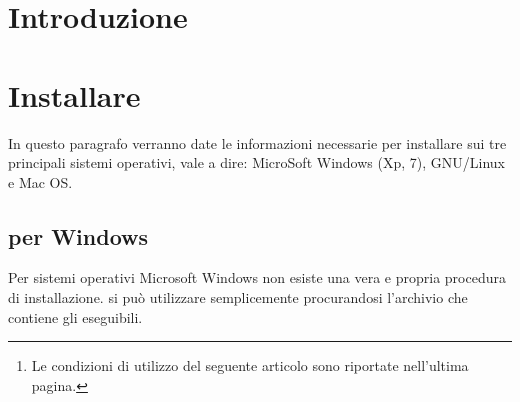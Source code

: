 \documentclass[10pt,a4paper]{article}
\title{\titolo}
\author{%
\autorea \and 
\autoreb \and 
\autorec
}
\date{\today\thanks{Le condizioni di utilizzo del seguente articolo
    sono riportate nell'ultima pagina.}}
\begin{document}
 
\maketitle
\begin{abstract}
\noindent In questo articolo vengono brevemente presentati il
programma \emacs{} ed il pacchetto \auctex, per le principali
piattaforme: Windows, GNU/Linux e Mac OS. Dopo una introduzione ai programmi,
verranno esposte le modalità per poter installare e configurare
\emacs{} e \auctex{} per poter scrivere     
documenti \LaTeX{}. L'articolo non ha la pretesa di essere un
\emph{manuale}, bensì un piccolo tutorial per far avvicinare gli 
utenti di \LaTeX{} a questo programma, non così troppo complicato 
come spesso viene indicato.
\end{abstract}

\begin{multicols}{2}
  \tableofcontents
\end{multicols}

\section{Introduzione}
\label{sec:intro}

\textcolor{red}{\lipsum[1]}

\section{Installare \emacs}
\label{sec:install}

In questo paragrafo verranno date le informazioni necessarie per installare
\emacs{} sui tre principali sistemi operativi, vale a dire: 
\textsf{MicroSoft Windows (Xp, 7)},
\textsf{GNU/Linux} e %
\textsf{Mac OS}.  %

\subsection*{\emacs{} per Windows}
\label{sec:installwin}
Per sistemi operativi Microsoft Windows non esiste una vera e propria
procedura di installazione. \emacs{} si può utilizzare semplicemente
procurandosi l'archivio che contiene gli eseguibili.
\end{document}
